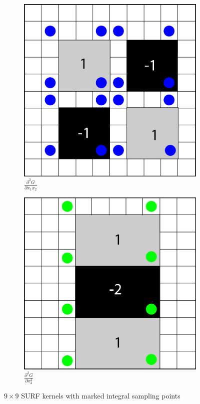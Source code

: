 \documentclass{article}
\begin{document}
\begin{figure}[h]
\begin{subfigure}[b]{0.3\textwidth}
		\includegraphics[width=\textwidth]{figures/hessian/gaussian_second_order_kernel_xy_integral}
		\caption{$\frac{\partial^2 G}{\partial x_1 x_2}$}
	\end{subfigure}
	\begin{subfigure}[b]{0.3\textwidth}
		\centering
		\includegraphics[width=\textwidth]{figures/hessian/gaussian_second_order_kernel_yy_integral}
		\caption{$\frac{\partial^2 G}{\partial x_2^2}$}
	\end{subfigure}
	\caption{$9 \times 9$ SURF kernels with marked integral sampling points}
	\label{fig_gaussian_integral_kernels}
\end{figure}
\end{document}
